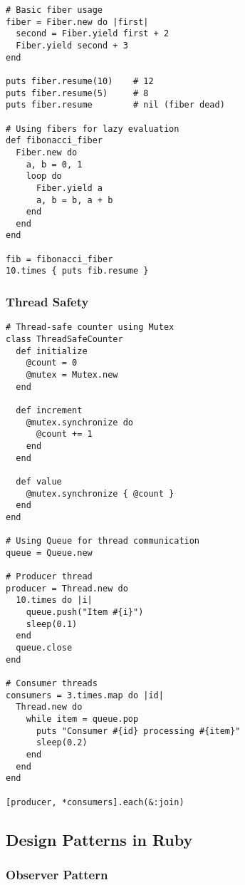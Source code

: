 \documentclass[12pt,a4paper]{article}
\begin{document}
\begin{lstlisting}
# Basic fiber usage
fiber = Fiber.new do |first|
  second = Fiber.yield first + 2
  Fiber.yield second + 3
end

puts fiber.resume(10)    # 12
puts fiber.resume(5)     # 8
puts fiber.resume        # nil (fiber dead)

# Using fibers for lazy evaluation
def fibonacci_fiber
  Fiber.new do
    a, b = 0, 1
    loop do
      Fiber.yield a
      a, b = b, a + b
    end
  end
end

fib = fibonacci_fiber
10.times { puts fib.resume }
\end{lstlisting}

\subsubsection{Thread Safety}

\begin{lstlisting}
# Thread-safe counter using Mutex
class ThreadSafeCounter
  def initialize
    @count = 0
    @mutex = Mutex.new
  end

  def increment
    @mutex.synchronize do
      @count += 1
    end
  end

  def value
    @mutex.synchronize { @count }
  end
end

# Using Queue for thread communication
queue = Queue.new

# Producer thread
producer = Thread.new do
  10.times do |i|
    queue.push("Item #{i}")
    sleep(0.1)
  end
  queue.close
end

# Consumer threads
consumers = 3.times.map do |id|
  Thread.new do
    while item = queue.pop
      puts "Consumer #{id} processing #{item}"
      sleep(0.2)
    end
  end
end

[producer, *consumers].each(&:join)
\end{lstlisting}

\subsection{Design Patterns in Ruby}

\subsubsection{Observer Pattern}
\end{document}
